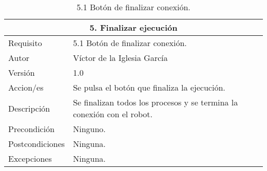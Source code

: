 \begin{table}[h]
    \centering
    \begin{tabular}{| m{3cm} | m{8cm} |}
    \hline
       \multicolumn{2}{|c|}{\textbf{5. Finalizar ejecución}}                \\ \hline 
        Requisito & 5.1 Botón de finalizar conexión.\\ \hline
       Autor  &  Víctor de la Iglesia García \\ \hline
        Versión & 1.0 \\ \hline
        Accion/es & Se pulsa el botón que finaliza la ejecución. \\ \hline
        Descripción & Se finalizan todos los procesos y se termina la conexión con el robot. \\ \hline
        Precondición & Ninguno. \\ \hline
        Postcondiciones & Ninguna. \\ \hline
        Excepciones & Ninguna. \\ \hline
    \end{tabular}
    \caption{5.1 Botón de finalizar conexión.}
    \label{5.1 Botón de finalizar conexión.}
\end{table}








